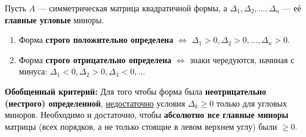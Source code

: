 \begin{theorem}
Пусть $A$ — симметрическая матрица квадратичной формы, а $\Delta_1, \Delta_2, \dots, \Delta_n$ — её \textbf{главные угловые} миноры.
\begin{enumerate}
    \item Форма \textbf{строго положительно определена} $\iff$ $\Delta_1 > 0, \Delta_2 > 0, \dots, \Delta_n > 0$.
    \item Форма \textbf{строго отрицательно определена} $\iff$ знаки чередуются, начиная с минуса: $\Delta_1 < 0, \Delta_2 > 0, \Delta_3 < 0, \dots$
\end{enumerate}
\end{theorem}

\textbf{Обобщенный критерий:} 
Для того чтобы форма была \textbf{неотрицательно (нестрого) определенной}, \underline{недостаточно} условия $\Delta_k \ge 0$ только для угловых миноров. Необходимо и достаточно, чтобы \textbf{абсолютно все главные миноры} матрицы (всех порядков, а не только стоящие в левом верхнем углу) были $\ge 0$.
